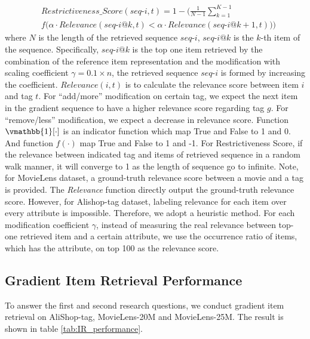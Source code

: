 \begin{equation}
\begin{aligned}
& Restrictiveness\_Score(seq\text{-}i,t) = 1 - \Big(\frac{1}{N-1}\sum_{k=1}^{K-1} \\ & f\big( \alpha \cdot Relevance(seq\text{-}{i}@k, {t}) < \alpha  \cdot Relevance(seq\text{-}{i}@k+1, {t}) \big)\Big)
\end{aligned}
\label{equ:mgs_r}
\end{equation}
where $N$ is the length of the retrieved sequence $seq\text{-}i$, $seq\text{-}i@k$ is the $k$-th item of the sequence. Specifically, $seq\text{-}i@k$ is the top one item retrieved by the combination of the reference item representation and the modification with scaling coefficient $\gamma = 0.1 \times n$, the retrieved sequence $seq\text{-}i$ is formed by increasing the coefficient. $Relevance(i,t)$ is to calculate the relevance score between item $i$ and tag $t$. For ``add/more'' modification on certain tag, we expect the next item in the gradient sequence to have a higher relevance score regarding tag $g$. For ``remove/less'' modification, we expect a decrease in relevance score. Function $\vmathbb{1}[\cdot]$ is an indicator function which map True and False to 1 and 0. And function $f(\cdot)$ map True and False to 1 and -1. For Restrictiveness Score, if the relevance between indicated tag and items of retrieved sequence in a random walk manner, it will converge to 1 as the length of sequence go to infinite. Note, for MovieLens dataset, a ground-truth relevance score between a movie and a tag is provided. The \textit{Relevance} function directly output the ground-truth relevance score. However, for Alishop-tag dataset, labeling relevance for each item over every attribute is impossible. Therefore, we adopt a heuristic method. For each modification coefficient $\gamma$, instead of measuring the real relevance between top-one retrieved item and a certain attribute, we use the occurrence ratio of items, which has the attribute, on top 100 as the relevance score.


\subsection{Gradient Item Retrieval Performance}
To answer the first and second research questions, we conduct gradient item retrieval on AliShop-tag, MovieLens-20M and MovieLens-25M. The result is shown in table \ref{tab:IR_performance}. 

